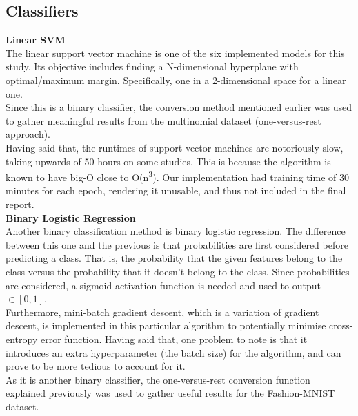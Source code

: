 \documentclass[11pt,a4paper]{article}
\begin{document}
\subsection*{Classifiers}

\noindent
\textbf{Linear SVM}\\

\noindent The linear support vector machine is one of the six implemented models for this study. Its objective includes finding a N-dimensional hyperplane with optimal/maximum margin. Specifically, one in a 2-dimensional space for a linear one.\\

\noindent Since this is a binary classifier, the conversion method mentioned earlier was used to gather meaningful results from the multinomial dataset (one-versus-rest approach).\\

\noindent Having said that, the runtimes of support vector machines are notoriously slow, taking upwards of 50 hours on some studies. This is because the algorithm is known to have big-O close to O(n\textsuperscript{3}). Our implementation had training time of 30 minutes for each epoch, rendering it unusable, and thus not included in the final report.\\

\noindent
\textbf{Binary Logistic Regression}\\

\noindent Another binary classification method is binary logistic regression. The difference between this one and the previous is that probabilities are first considered before predicting a class. That is, the probability that the given features belong to the class versus the probability that it doesn't belong to the class. Since probabilities are considered, a sigmoid activation function is needed and used to output $\in [0, 1]$.\\

\noindent Furthermore, mini-batch gradient descent, which is a variation of gradient descent, is implemented in this particular algorithm to potentially minimise cross-entropy error function. Having said that, one problem to note is that it introduces an extra hyperparameter (the batch size) for the algorithm, and can prove to be more tedious to account for it.\\

\noindent As it is another binary classifier, the one-versus-rest conversion function explained previously was used to gather useful results for the Fashion-MNIST dataset.\\
\end{document}

